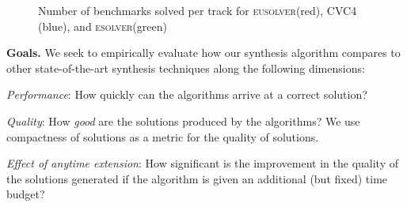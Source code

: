 \documentclass{llncs}
\renewcommand{\paragraph}[1]{\par\noindent\textbf{#1.}}
\newcommand{\esolver}{\textsc{esolver}\xspace}
\newcommand{\eusolver}{\textsc{eusolver}\xspace}
\begin{document}
\begin{wrapfigure}{l}{0.37\textwidth}%
\centering
  \caption{Number of benchmarks solved per track for \eusolver (red),
  CVC4 (blue), and \esolver (green)}
    \label{fig:num_solved}
\end{wrapfigure}
\paragraph{Goals}
We seek to empirically evaluate how our synthesis algorithm compares
to other state-of-the-art synthesis techniques along the following
dimensions:
\begin{inparaenum}[(a)]
\item
\emph{Performance}: How quickly can the algorithms arrive at a correct
solution?
\item
\emph{Quality}: How \emph{good} are the solutions produced by the
algorithms? We use compactness of solutions
as a metric for the quality of solutions.
\item
\emph{Effect of anytime extension}: How significant is the
improvement in the quality of the solutions generated
if the algorithm is given an additional (but fixed) time budget?
\end{inparaenum}
\end{document}
